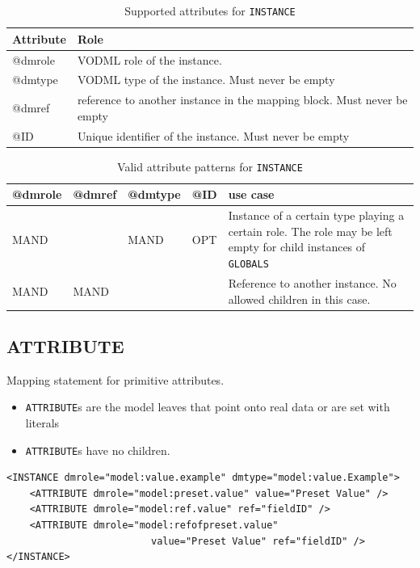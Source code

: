 \documentclass[11pt,a4paper]{ivoa}
\begin{document}
\begin{table}[!htbp]
     \begin{tabular}{|p{1.5cm}|p{10.5cm}|}
       \hline Attribute &  Role\\
       \hline  @dmrole    & VODML role of the instance.  \\
       \hline  @dmtype & VODML type of the instance.  Must never be empty \\
       \hline  @dmref  & reference to another instance in the mapping block.  Must never be empty\\          
       \hline  @ID  & Unique identifier of the instance. Must never be empty\\
       \hline 
     \end{tabular}
     \caption{Supported attributes for  \texttt{INSTANCE}} 
     \label{tbl:inst-att}
 \end{table}

\begin{table}[!htbp]
\begin{tabular}{|p{1.5cm}|p{1.5cm}|p{1.5cm}|p{1cm}|p{5cm}|}
\hline @dmrole & @dmref &  @dmtype &  @ID &  use case\\
\hline  MAND &  & MAND & OPT & Instance of a certain type playing a certain role. The role may be left empty  for child instances of 
                                      \texttt{GLOBALS} \\
\hline  MAND  & MAND  &  &  & Reference to another instance. No allowed children in this case.  \\

\hline 
\end{tabular}
     \caption{Valid attribute patterns for  \texttt{INSTANCE}} 
     \label{tbl:inst-pattern}
 \end{table}

\subsection{ATTRIBUTE}

Mapping statement for primitive attributes.

\begin{itemize}
    \item \texttt{ATTRIBUTE}s  are the model leaves that point onto real data or are set with literals
    \item \texttt{ATTRIBUTE}s have no children.
\end{itemize}

\begin{lstlisting}[caption={ATTRIBUTE examples},captionpos=b]
<INSTANCE dmrole="model:value.example" dmtype="model:value.Example">
    <ATTRIBUTE dmrole="model:preset.value" value="Preset Value" />    
    <ATTRIBUTE dmrole="model:ref.value" ref="fieldID" />    
    <ATTRIBUTE dmrole="model:refofpreset.value" 
                         value="Preset Value" ref="fieldID" />
</INSTANCE>
\end{lstlisting}
\end{document}
